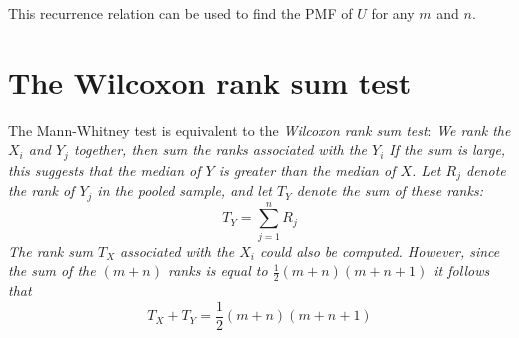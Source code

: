 This recurrence relation can be used to find the PMF of $U$ for any $m$ and $n$.
\een


%
%
%
%
%
%
%
%
%
%

%

\section{The Wilcoxon rank sum test}
The Mann-Whitney test is equivalent to the \emph{Wilcoxon rank sum test}: 
\bit
\it We rank the $X_i$ and $Y_j$ together, then sum the ranks associated with the $Y_i$ 
\it If the sum is large, this suggests that the median of $Y$ is greater than the median of $X$.
\it Let $R_j$ denote the rank of $Y_j$ in the pooled sample, and let $T_Y$ denote the sum of these ranks:
\[
T_Y = \sum_{j=1}^n R_j
\]
\it The rank sum $T_X$ associated with the $X_i$ could also be computed. However, since the sum of the $(m+n)$ ranks is equal to $\frac{1}{2}(m+n)(m+n+1)$ it follows that
\[
T_X + T_Y = \frac{1}{2}(m+n)(m+n+1)
\]
\eit



